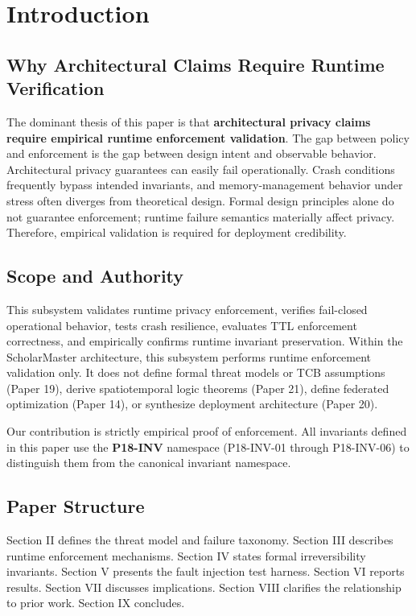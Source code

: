 \documentclass[conference]{IEEEtran}
\begin{document}
\section{Introduction}

\subsection{Why Architectural Claims Require Runtime Verification}
The dominant thesis of this paper is that \textbf{architectural privacy claims require empirical runtime enforcement validation}. The gap between policy and enforcement is the gap between design intent and observable behavior. Architectural privacy guarantees can easily fail operationally. Crash conditions frequently bypass intended invariants, and memory-management behavior under stress often diverges from theoretical design. Formal design principles alone do not guarantee enforcement; runtime failure semantics materially affect privacy. Therefore, empirical validation is required for deployment credibility. 

\subsection{Scope and Authority}
This subsystem validates runtime privacy enforcement, verifies fail-closed operational behavior, tests crash resilience, evaluates TTL enforcement correctness, and empirically confirms runtime invariant preservation. Within the ScholarMaster architecture, this subsystem performs runtime enforcement validation only. It does not define formal threat models or TCB assumptions (Paper 19), derive spatiotemporal logic theorems (Paper 21), define federated optimization (Paper 14), or synthesize deployment architecture (Paper 20). 

Our contribution is strictly empirical proof of enforcement. All invariants defined in this paper use the \textbf{P18-INV} namespace (P18-INV-01 through P18-INV-06) to distinguish them from the canonical invariant namespace.

\subsection{Paper Structure}
Section II defines the threat model and failure taxonomy. Section III describes runtime enforcement mechanisms. Section IV states formal irreversibility invariants. Section V presents the fault injection test harness. Section VI reports results. Section VII discusses implications. Section VIII clarifies the relationship to prior work. Section IX concludes.
\end{document}

